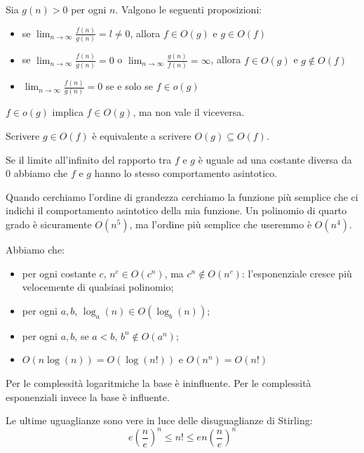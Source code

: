 Sia $g(n) > 0$ per ogni $n$. Valgono le seguenti proposizioni:
\begin{itemize}
    \item se $\displaystyle\lim_{n \to \infty}\frac{f(n)}{g(n)} = l \not= 0$, allora $f \in O(g)$ e $g \in
    O(f)$
    \item se $\displaystyle\lim_{n \to \infty}\frac{f(n)}{g(n)} = 0$ o $\displaystyle\lim_{n \to \infty}\frac{g(n)}{f(n)} =
    \infty$, allora $f \in O(g)$ e $g \notin O(f)$
    \item $\displaystyle\lim_{n \to \infty}\frac{f(n)}{g(n)} = 0$ se e solo se $f \in o(g)$
\end{itemize}

$f \in o(g)$ implica $f \in O(g)$, ma non vale il viceversa.

Scrivere $g \in O(f)$ è equivalente a scrivere $O(g) \subseteq O(f)$.

Se il limite all'infinito del rapporto tra $f$ e $g$ è uguale ad una costante diversa da 0 abbiamo che
$f$ e $g$ hanno lo stesso comportamento asintotico.

Quando cerchiamo l'ordine di grandezza cerchiamo la funzione più semplice che ci indichi il
comportamento asintotico della mia funzione. Un polinomio di quarto grado è sicuramente $O(n^{5})$,
ma l'ordine più semplice che useremmo è $O(n^{4})$.

Abbiamo che:
\begin{itemize}
    \item per ogni costante $c$, $n^{c} \in O(c^{n})$, ma $c^{n} \notin O(n^{c})$: l'esponenziale
    cresce più velocemente di qualsiasi polinomio;
    \item per ogni $a,b$, $\log_{a}(n) \in O(\log_{b}(n))$;
    \item per ogni $a,b$, se $a < b$, $b^{n} \notin O(a^{n})$;
    \item $O(n \log(n)) = O(\log(n!))$ e $O(n^{n}) = O(n!)$ 
\end{itemize}

Per le complessità logaritmiche la base è ininfluente. Per le complessità esponenziali invece la
base è influente.

Le ultime uguaglianze sono vere in luce delle disuguaglianze di Stirling:
\begin{equation*}
    e\left(\frac{n}{e}\right)^{n} \leq n! \leq e n \left(\frac{n}{e}\right)^{n}
\end{equation*}

